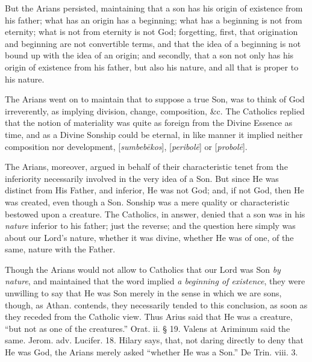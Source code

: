 But the Arians persisted, maintaining that a son
has his origin of existence from his father; what has an origin has a
beginning; what has a beginning is not from eternity; what is not from
eternity is not God; forgetting, first, that origination and beginning
are not convertible terms, and that the idea of a beginning is not
bound up with the idea of an origin; and secondly, that a son not only
has his origin of existence from his father, but also his nature, and
all that is proper to his nature.

The Arians went on to maintain that to suppose a
true Son, was to think of God irreverently, as implying division,
change, composition, \&c. The Catholics replied that the notion of
materiality was quite as foreign from the Divine Essence as time, and
as a Divine Sonship could be eternal, in like manner it implied
neither composition nor development, [\emph{sumbeb\={e}kos}], [\emph{peribol\={e}}]
or [\emph{probol\={e}}].

The Arians, moreover, argued in behalf of their
characteristic tenet from the inferiority necessarily involved in the
very idea of a Son. But since He was distinct from His Father, and
inferior, He was not God; and, if not God, then He was created, even
though a Son. Sonship was a mere quality or characteristic bestowed
upon a creature. The Catholics, in answer, denied that a son was in
his \emph{nature} inferior to his father; just the reverse; and the question
here simply was about our Lord's nature, whether it was divine,
whether He was of one, of the same, nature with the Father.

Though the Arians would not allow to Catholics
that our Lord was Son \emph{by nature}, and maintained that the word
implied \emph{a beginning of existence}, they were unwilling to say
that He was Son merely in the sense in which we are sons, though, as
Athan. contends, they necessarily tended to this conclusion, as soon
as they receded from the Catholic view. Thus Arius said that He was a
creature, ``but not as one of the creatures.'' Orat. ii. § 19. Valens
at Ariminum said the same. Jerom. adv. Lucifer. 18. Hilary says, that,
not daring directly to deny that He was God, the Arians merely asked ``whether
He was a Son.'' De Trin. viii. 3.

